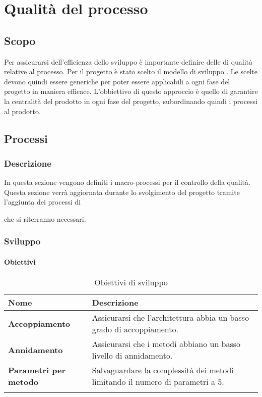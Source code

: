 \section{Qualità del processo}
\label{QProcesso}
\subsection{Scopo}
Per assicurarsi dell'efficienza dello sviluppo è importante definire delle  di qualità relative al processo.
Per il progetto è stato scelto il modello di sviluppo .
Le  scelte devono quindi essere generiche per poter essere applicabili a ogni fase del progetto in maniera efficace.
L'obbiettivo di questo approccio è quello di garantire la centralità del prodotto in ogni fase del progetto, subordinando quindi i processi al prodotto.

\subsection{Processi}
\subsubsection{Descrizione}
In questa sezione vengono definiti i macro-processi per il controllo della qualità.
Questa sezione verrà aggiornata durante lo svolgimento del progetto tramite l'aggiunta dei processi di  che si riterranno necessari.

\subsubsection{Sviluppo}
\paragraph{Obiettivi}
\setlength{\freewidth}{\dimexpr\textwidth-0\tabcolsep}
	\renewcommand{\arraystretch}{1.5}
	\setlength{\aboverulesep}{0pt}
	\setlength{\belowrulesep}{0pt}
	\begin{longtable}{L{.365\freewidth} L{.6 \freewidth}}
		\textbf{Nome} & \textbf{Descrizione} \\
		\toprule
		\endhead		
		\textbf{Accoppiamento} & Assicurarsi che l'architettura abbia un basso grado di accoppiamento. \\
		\textbf{Annidamento} & Assicurarsi che i metodi abbiano un basso livello di annidamento. \\
		\textbf{Parametri per metodo} & Salvaguardare la complessità dei metodi limitando il numero di parametri a 5. \\
		\bottomrule
		\hiderowcolors
		\caption{Obiettivi di sviluppo}
	\end{longtable}

